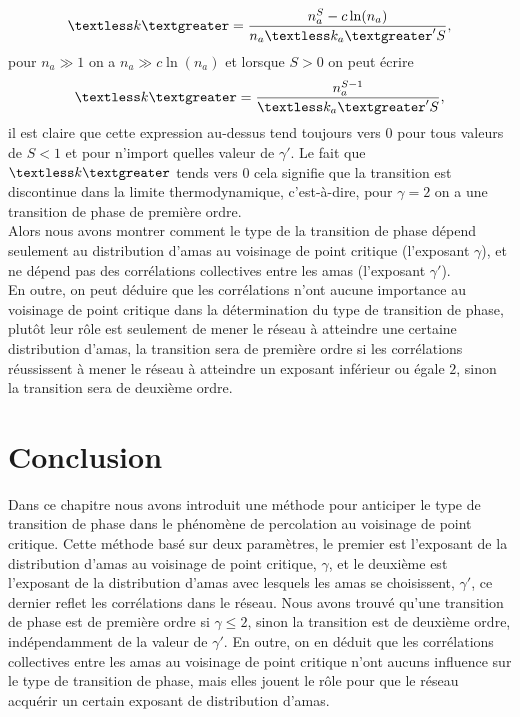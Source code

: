  \begin{equation}
 \km=\frac{n_a^S-c\ln(n_a)}{n_a\kma' S},
 \end{equation}
  pour $n_a\gg1$ on a $n_a\gg c\ln(n_a)$ et lorsque $S>0$ on peut écrire
  \begin{equation}
  \km=\frac{n_a^{S-1}}{\kma' S},
  \end{equation}
  il est claire que cette expression au-dessus tend toujours vers $0$ pour tous valeurs de $S<1$ et pour n'import quelles valeur de $\gamma'$. Le fait que $\km$ tends vers $0$ cela signifie que la transition est discontinue dans la limite thermodynamique, c'est-à-dire, pour $\gamma=2$ on a une transition de phase de première ordre.\\
  Alors nous avons montrer comment le type de la transition de phase dépend seulement au distribution d'amas au voisinage de point critique (l'exposant $\gamma$), et ne dépend pas des corrélations collectives entre les amas (l'exposant $\gamma'$). \\ 
  En outre, on peut déduire que les corrélations n'ont aucune importance au voisinage de point critique dans la détermination du type de transition de phase, plutôt leur rôle est seulement de mener le réseau à atteindre une certaine distribution d'amas, la transition sera de première ordre si les corrélations réussissent à mener le réseau à atteindre un exposant inférieur ou égale $2$, sinon la transition sera de deuxième ordre. 
\section{Conclusion}
Dans ce chapitre nous avons introduit une méthode pour anticiper  le type de transition de phase dans le phénomène de percolation au voisinage de point critique. Cette méthode basé sur deux paramètres, le premier est l'exposant de la distribution d'amas au voisinage de point critique, $\gamma$, et le deuxième est l'exposant de la distribution d'amas avec lesquels les amas se choisissent, $\gamma'$, ce dernier reflet les corrélations dans le réseau. Nous avons trouvé qu'une transition de phase est de première ordre si $\gamma\leq2$, sinon la transition est de deuxième ordre, indépendamment de la valeur de $\gamma'$.  En outre, on en déduit que les corrélations collectives entre les amas au voisinage de point critique n'ont aucuns influence sur le type de transition de phase, mais elles jouent le rôle pour que le réseau acquérir un certain exposant de distribution d'amas.   

